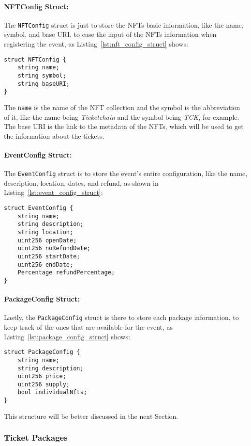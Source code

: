 \paragraph{NFTConfig Struct:} The \texttt{NFTConfig} struct is just to store the NFTs basic information, like
the name, symbol, and base URI, to ease the input of the NFTs information when
registering the event, as Listing~\ref{lst:nft_config_struct} shows:
\begin{lstlisting}[caption=NFTConfig struct,label={lst:nft_config_struct}]
struct NFTConfig {
	string name;
	string symbol;
	string baseURI;
}
\end{lstlisting}
The \texttt{name} is the name of the NFT collection and the symbol is the
abbreviation of it, like the name being \textit{Ticketchain} and the symbol
being \textit{TCK}, for example. The base URI is the link to the metadata of
the NFTs, which will be used to get the information about the tickets.

\paragraph{EventConfig Struct:} The \texttt{EventConfig} struct is to store the event's entire configuration,
like the name, description, location, dates, and refund, as shown in
Listing~\ref{lst:event_config_struct}:
\begin{lstlisting}[caption=EventConfig struct,label={lst:event_config_struct}]
struct EventConfig {
	string name;
	string description;
	string location;
	uint256 openDate;
	uint256 noRefundDate;
	uint256 startDate;
	uint256 endDate;
	Percentage refundPercentage;
}
\end{lstlisting}

\paragraph{PackageConfig Struct:} Lastly, the \texttt{PackageConfig} struct is there to store each package
information, to keep track of the ones that are available for the event, as
Listing~\ref{lst:package_config_struct} shows:
\begin{lstlisting}[caption=PackageConfig struct,label={lst:package_config_struct}]
struct PackageConfig {
	string name;
	string description;
	uint256 price;
	uint256 supply;
	bool individualNfts;
}
\end{lstlisting}
This structure will be better discussed in the next Section.

\subsubsection{Ticket Packages}\label{subsubsec:ticket_packages}

